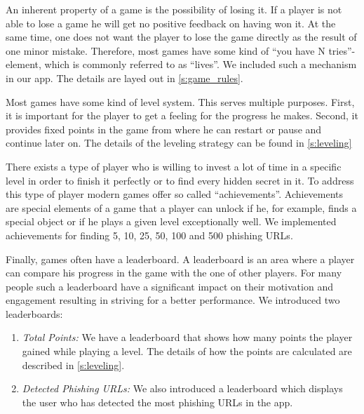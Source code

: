 \begin{description}[leftmargin=0cm]
\item[Lives:] An inherent property of a game is the possibility of losing it.
If a player is not able to lose a game he will get no positive feedback on having won it.
At the same time, one does not want the player to lose the game directly as the result of one minor mistake.
Therefore, most games have some kind of ``you have N tries''-element, which is commonly referred to as ``lives''.
We included such a mechanism in our app.
The details are layed out in \autoref{s:game_rules}.
\item[Levels:] Most games have some kind of level system.
This serves multiple purposes.
First, it is important for the player to get a feeling for the progress he makes.
Second, it provides fixed points in the game from where he can restart or pause and continue later on.
The details of the leveling strategy can be found in \autoref{s:leveling}

\item[Achievements:] There exists a type of player who is willing to invest a lot of time in a specific level in order to finish it perfectly or to find every hidden secret in it.
To address this type of player modern games offer so called ``achievements''.
Achievements are special elements of a game that a player can unlock if he, for example, finds a special object or if he plays a given level exceptionally well. 
We implemented achievements for finding 5, 10, 25, 50, 100 and 500 phishing URLs. 

\item[Leaderboards:] Finally, games often have a leaderboard.
A leaderboard is an area where a player can compare his progress in the game with the one of other players.
For many people such a leaderboard have a significant impact on their motivation and engagement resulting in striving for a better performance.
We introduced two leaderboards:
\begin{enumerate}
\item \textit{Total Points:} We have a leaderboard that shows how many points the player gained while playing a level. The details of how the points are calculated are described in \autoref{s:leveling}.
\item \textit{Detected Phishing URLs:} We also introduced a leaderboard which displays the user who has detected the most phishing URLs in the app. 
\end{enumerate}

\end{description}

